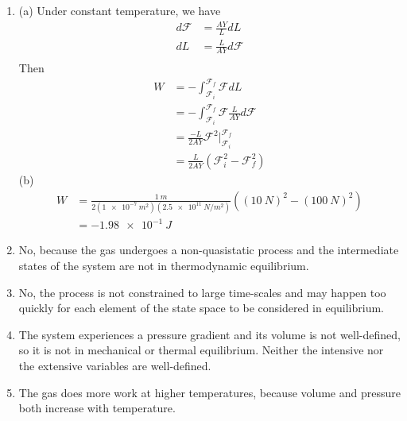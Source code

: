 \documentclass[a4paper,12pt]{article}
\begin{document}
\begin{enumerate}
    \item (a) Under constant temperature, we have
    \begin{align*}
        d\mathscr{F} &= \frac{AY}{L}dL \\
        dL &= \frac{L}{AY} d\mathscr{F} \\
    \end{align*}
    Then
    \begin{align*}
        W &= -\int_{\mathscr{F}_i}^{\mathscr{F}_f} \mathscr{F} dL \\
        &= -\int_{\mathscr{F}_i}^{\mathscr{F}_f} \mathscr{F} \frac{L}{AY} d\mathscr{F} \\
        &= \frac{-L}{2AY} \mathscr{F}^2 \biggr \rvert_{\mathscr{F}_i}^{\mathscr{F}_f} \\
        &= \frac{L}{2AY} (\mathscr{F}_i^2 - \mathscr{F}_f^2)
    \end{align*}
    (b)
    \begin{align*} 
        W &= \frac{\SI{1}{m}}{2(\SI{1e-7}{m^2})(\SI{2.5e11}{N/m^2})} ((\SI{10}{N})^2 - (\SI{100}{N})^2) \\
        &= \SI{-1.98e-1}{J}
    \end{align*}

    \item No, because the gas undergoes a non-quasistatic process and the intermediate states of the system are not in thermodynamic equilibrium.

    \item No, the process is not constrained to large time-scales and may happen too quickly for each element of the state space to be considered in equilibrium.

    \setcounter{enumi}{7}
    \item The system experiences a pressure gradient and its volume is not well-defined, so it is not in mechanical or thermal equilibrium. Neither the intensive nor the extensive variables are well-defined.

    \setcounter{enumi}{9}
    \item The gas does more work at higher temperatures, because volume and pressure both increase with temperature.

\end{enumerate}
\end{document}
